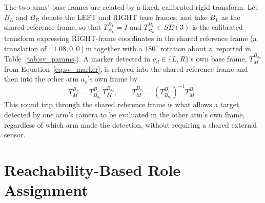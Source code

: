 The two arms' base frames are related by a fixed, calibrated rigid transform. Let $B_L$ and $B_R$
denote the LEFT and RIGHT base frames, and take $B_L$ as the shared reference frame, so that
$T^{B_L}_{B_L} = I$ and $T^{B_L}_{B_R} \in SE(3)$ is the calibrated transform expressing RIGHT-frame
coordinates in the shared reference frame (a translation of $[1.08, 0, 0]$\,m together with a
$180^\circ$ rotation about $z$, reported in Table~\ref{tab:sv_params}). A marker detected in
$a_d \in \{L, R\}$'s own base frame, $T^{B_{a_d}}_{M}$ from Equation~\eqref{eq:sv_marker}, is relayed
into the shared reference frame and then into the other arm $a_o$'s own frame by
\begin{equation}
T^{B_L}_{M} = T^{B_L}_{B_{a_d}}\, T^{B_{a_d}}_{M}, \qquad
T^{B_{a_o}}_{M} = \left( T^{B_L}_{B_{a_o}} \right)^{-1} T^{B_L}_{M}.
\label{eq:sv_relay}
\end{equation}
This round trip through the shared reference frame is what allows a target detected by one arm's
camera to be evaluated in the other arm's own frame, regardless of which arm made the detection,
without requiring a shared external sensor.

\section{Reachability-Based Role Assignment}\label{sec:sv_reachability}

